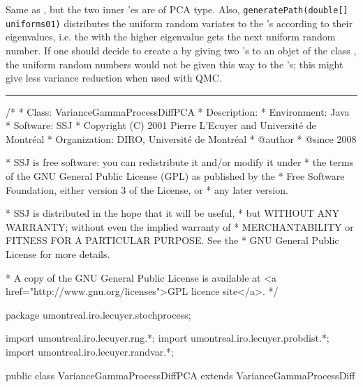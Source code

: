 %
%
%


Same as , but the two inner 
'es are of PCA type.  Also, 
\texttt{generatePath(double[] uniforms01)} distributes 
the uniform random variates to the 's  according to their 
eigenvalues, i.e. the  with the higher eigenvalue 
gets the next uniform random number.  If one should decide to create a 
 by giving two 's to an 
objet of the class , the uniform random 
numbers would not be given this way
to the 's; this  might give less variance reduction when 
used with QMC.

\bigskip\hrule\bigskip

\begin{code}
\begin{hide}
/*
 * Class:        VarianceGammaProcessDiffPCA
 * Description:  
 * Environment:  Java
 * Software:     SSJ 
 * Copyright (C) 2001  Pierre L'Ecuyer and Université de Montréal
 * Organization: DIRO, Université de Montréal
 * @author       
 * @since        2008

 * SSJ is free software: you can redistribute it and/or modify it under
 * the terms of the GNU General Public License (GPL) as published by the
 * Free Software Foundation, either version 3 of the License, or
 * any later version.

 * SSJ is distributed in the hope that it will be useful,
 * but WITHOUT ANY WARRANTY; without even the implied warranty of
 * MERCHANTABILITY or FITNESS FOR A PARTICULAR PURPOSE.  See the
 * GNU General Public License for more details.

 * A copy of the GNU General Public License is available at
   <a href="http://www.gnu.org/licenses">GPL licence site</a>.
 */
\end{hide}
package umontreal.iro.lecuyer.stochprocess;\begin{hide}
import umontreal.iro.lecuyer.rng.*;
import umontreal.iro.lecuyer.probdist.*;
import umontreal.iro.lecuyer.randvar.*;

\end{hide}

public class VarianceGammaProcessDiffPCA extends VarianceGammaProcessDiff \begin{hide} {
    int[] indexEigenUp;
    int[] indexEigenDw;

\end{hide}
\end{code}
